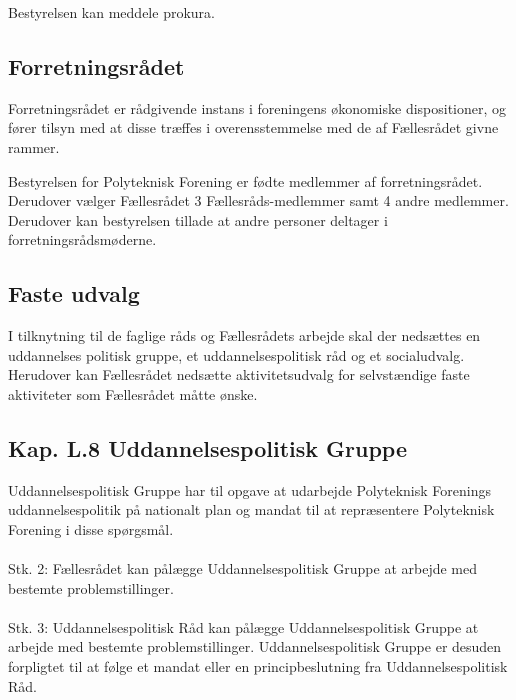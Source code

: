 \begin{list}
\item Bestyrelsen kan meddele prokura.


\subsection{Forretningsrådet}
\label{kapL:FRR}
\item Forretningsrådet er rådgivende instans i foreningens økonomiske dispositioner, og fører tilsyn med at disse træffes i overensstemmelse med de af Fællesrådet givne rammer.

\item Bestyrelsen for Polyteknisk Forening er fødte medlemmer af forretningsrådet. Derudover vælger Fællesrådet 3 Fællesråds-medlemmer samt 4 andre medlemmer. Derudover kan bestyrelsen tillade at andre personer deltager i forretningsrådsmøderne.

\subsection{Faste udvalg}
\label{kapL:fasteUdvalg}
\item I tilknytning til de faglige råds og Fællesrådets arbejde skal der nedsættes en uddannelses politisk gruppe, et uddannelsespolitisk råd og et socialudvalg. Herudover kan Fællesrådet nedsætte aktivitetsudvalg for selvstændige faste aktiviteter som Fællesrådet måtte ønske.

\subsection{Kap. L.8 Uddannelsespolitisk Gruppe}
\label{kapL:UPG}
\item Uddannelsespolitisk Gruppe har til opgave at udarbejde Polyteknisk Forenings uddannelsespolitik på nationalt plan og mandat til at repræsentere Polyteknisk Forening i disse spørgsmål.
\\
\\
Stk. 2: Fællesrådet kan pålægge Uddannelsespolitisk Gruppe at arbejde med bestemte problemstillinger.
\\
\\
Stk. 3: Uddannelsespolitisk Råd kan pålægge Uddannelsespolitisk Gruppe at arbejde med bestemte problemstillinger. Uddannelsespolitisk Gruppe er desuden forpligtet til at følge et mandat eller en principbeslutning fra Uddannelsespolitisk Råd.



\end{list}
